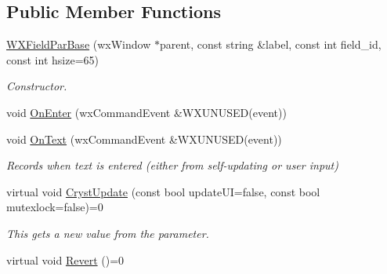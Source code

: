 \subsection*{Public Member Functions}
\begin{DoxyCompactItemize}
\item 
\mbox{\label{class_obj_cryst_1_1_w_x_field_par_base_af26d6a51ca7128eb9ef9bd86120aa681}} 
\mbox{\hyperlink{class_obj_cryst_1_1_w_x_field_par_base_af26d6a51ca7128eb9ef9bd86120aa681}{W\+X\+Field\+Par\+Base}} (wx\+Window $\ast$parent, const string \&label, const int field\+\_\+id, const int hsize=65)
\begin{DoxyCompactList}\small\item\em Constructor. \end{DoxyCompactList}\item 
void \mbox{\hyperlink{class_obj_cryst_1_1_w_x_field_par_base_a5c7c59452cada97c926f53b294a06e27}{On\+Enter}} (wx\+Command\+Event \&W\+X\+U\+N\+U\+S\+ED(event))
\item 
\mbox{\label{class_obj_cryst_1_1_w_x_field_par_base_af3b3b3085791ee0aba673e8ee2636d7e}} 
void \mbox{\hyperlink{class_obj_cryst_1_1_w_x_field_par_base_af3b3b3085791ee0aba673e8ee2636d7e}{On\+Text}} (wx\+Command\+Event \&W\+X\+U\+N\+U\+S\+ED(event))
\begin{DoxyCompactList}\small\item\em Records when text is entered (either from self-\/updating or user input) \end{DoxyCompactList}\item 
\mbox{\label{class_obj_cryst_1_1_w_x_field_par_base_a25b17ac92c4e3c618a6184c1c86a411a}} 
virtual void \mbox{\hyperlink{class_obj_cryst_1_1_w_x_field_par_base_a25b17ac92c4e3c618a6184c1c86a411a}{Cryst\+Update}} (const bool update\+UI=false, const bool mutexlock=false)=0
\begin{DoxyCompactList}\small\item\em This gets a new value from the parameter. \end{DoxyCompactList}\item 
virtual void \mbox{\hyperlink{class_obj_cryst_1_1_w_x_field_par_base_a27fd5066d2f6b6e87e213439fd8f7311}{Revert}} ()=0
\item 
\mbox{\label{class_obj_cryst_1_1_w_x_field_par_base_ae011448b1dfc529fdff60f057726397b}} 

\end{DoxyCompactItemize}
